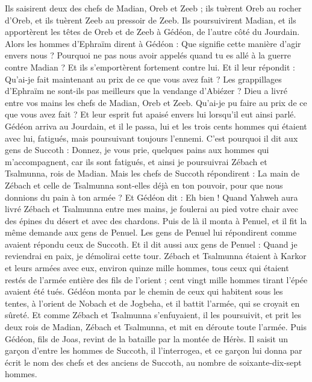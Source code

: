 \begin{multicols}{2}
Ils saisirent deux des chefs de Madian, Oreb et Zeeb ; ils tuèrent Oreb au rocher d’Oreb, et ils tuèrent Zeeb au pressoir de Zeeb. Ils poursuivirent Madian, et ils apportèrent les têtes de Oreb et de Zeeb à Gédéon, de l’autre côté du Jourdain.
\VerseOne{}Alors les hommes d'Ephraïm dirent à Gédéon : Que signifie cette manière d’agir envers nous ? Pourquoi ne pas nous avoir appelés quand tu es allé à la guerre contre Madian ? Et ils s'emportèrent fortement contre lui.
Et il leur répondit : Qu'ai-je fait maintenant au prix de ce que vous avez fait ? Les grappillages d'Ephraïm ne sont-ils pas meilleurs que la vendange d'Abiézer ?
Dieu a livré entre vos mains les chefs de Madian, Oreb et Zeeb. Qu'ai-je pu faire au prix de ce que vous avez fait ? Et leur esprit fut apaisé envers lui lorsqu’il eut ainsi parlé.
Gédéon arriva au Jourdain, et il le passa, lui et les trois cents hommes qui étaient avec lui, fatigués, mais poursuivant toujours l'ennemi.
C'est pourquoi il dit aux gens de Succoth : Donnez, je vous prie, quelques pains aux hommes qui m’accompagnent, car ils sont fatigués, et ainsi je poursuivrai Zébach et Tsalmunna, rois de Madian.
Mais les chefs de Succoth répondirent : La main de Zébach et celle de Tsalmunna sont-elles déjà en ton pouvoir, pour que nous donnions du pain à ton armée ?
Et Gédéon dit : Eh bien ! Quand Yahweh aura livré Zébach et Tsalmunna entre mes mains, je foulerai au pied votre chair avec des épines du désert et avec des chardons.
Puis de là il monta à Penuel, et il fit la même demande aux gens de Penuel. Les gens de Penuel lui répondirent comme avaient répondu ceux de Succoth.
Et il dit aussi aux gens de Penuel : Quand je reviendrai en paix, je démolirai cette tour.
Zébach et Tsalmunna étaient à Karkor et leurs armées avec eux, environ quinze mille hommes, tous ceux qui étaient restés de l'armée entière des fils de l’orient ; cent vingt mille hommes tirant l’épée avaient été tués.
Gédéon monta par le chemin de ceux qui habitent sous les tentes, à l’orient de Nobach et de Jogbeha, et il battit l'armée, qui se croyait en sûreté.
Et comme Zébach et Tsalmunna s'enfuyaient, il les poursuivit, et prit les deux rois de Madian, Zébach et Tsalmunna, et mit en déroute toute l'armée.
Puis Gédéon, fils de Joas, revint de la bataille par la montée de Hérès.
Il saisit un garçon d’entre les hommes de Succoth, il l'interrogea, et ce garçon lui donna par écrit le nom des chefs et des anciens de Succoth, au nombre de soixante-dix-sept hommes.

\end{multicols}
